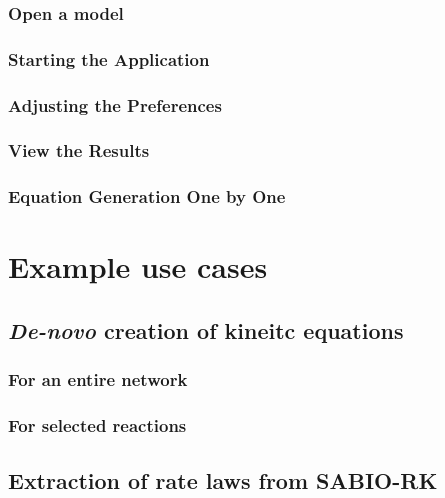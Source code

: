 \subsection{Open a model}
\subsection{Starting the Application}
\subsection{Adjusting the Preferences}
\subsection{View the Results}
\subsection{Equation Generation One by One}


\chapter{Example use cases}

\section{\emph{De-novo} creation of kineitc equations}
\subsection{For an entire network}
\subsection{For selected reactions}
\section{Extraction of rate laws from SABIO-RK}
